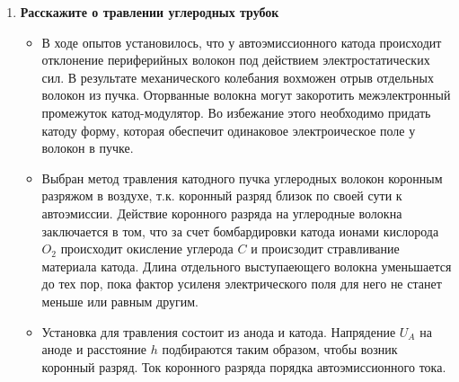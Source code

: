 \documentclass[a4paper]{article}
\begin{document}
\begin{enumerate}
	\item \textbf{Расскажите о травлении углеродных трубок}
	\begin{itemize}
		\item В ходе опытов установилось, что у автоэмиссионного катода происходит отклонение периферийных волокон под действием 
		электростатических сил. В результате механического колебания вохможен отрыв отдельных волокон из пучка. 
		Оторванные волокна могут закоротить межэлектронный промежуток катод-модулятор. Во избежание этого необходимо 
		придать катоду форму, которая обеспечит одинаковое электроическое поле у волокон в пучке. 

		\item Выбран метод травления катодного пучка углеродных волокон коронным разряжом в воздухе, т.к. коронный разряд
		близок по своей сути к автоэмиссии. Действие коронного разряда на углеродные волокна заключается в том, что за счет бомбардировки катода ионами кислорода $O_2$
		происходит окисление углерода $C$ и происзодит стравливание материала катода. Длина отдельного выступаеющего волокна уменьшается 
		до тех пор, пока фактор усиленя электрического поля для него не станет меньше или равным другим.

		\item Установка для травления состоит из анода и катода. Напрядение $U_A$ на аноде и расстояние $h$ подбираются таким образом, чтобы возник 
		коронный разряд. Ток коронного разряда порядка автоэмиссионного тока.


\end{itemize}
\end{enumerate}
\end{document}
